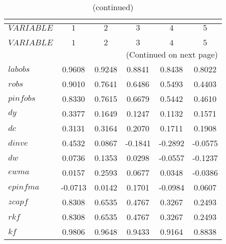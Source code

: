  
\begin{center}
\begin{longtable}{lccccc} 
\caption{AUTOCORRELATION OF SIMULATED VARIABLES}\\
 \label{Table:sim_autocorr_matrix}\\
\toprule 
$VARIABLE  $	 & 	 $          1$	 & 	 $          2$	 & 	 $          3$	 & 	 $          4$	 & 	 $          5$\\
\midrule \endfirsthead 
\caption{(continued)}\\
 \toprule \\ 
$VARIABLE  $	 & 	 $          1$	 & 	 $          2$	 & 	 $          3$	 & 	 $          4$	 & 	 $          5$\\
\midrule \endhead 
\midrule \multicolumn{6}{r}{(Continued on next page)} \\ \bottomrule \endfoot 
\bottomrule \endlastfoot 
$labobs    $	 & 	     0.9608	 & 	     0.9248	 & 	     0.8841	 & 	     0.8438	 & 	     0.8022 \\ 
$robs      $	 & 	     0.9010	 & 	     0.7641	 & 	     0.6486	 & 	     0.5493	 & 	     0.4403 \\ 
$pinfobs   $	 & 	     0.8330	 & 	     0.7615	 & 	     0.6679	 & 	     0.5442	 & 	     0.4610 \\ 
$dy        $	 & 	     0.3377	 & 	     0.1649	 & 	     0.1247	 & 	     0.1132	 & 	     0.1571 \\ 
$dc        $	 & 	     0.3131	 & 	     0.3164	 & 	     0.2070	 & 	     0.1711	 & 	     0.1908 \\ 
$dinve     $	 & 	     0.4532	 & 	     0.0867	 & 	    -0.1841	 & 	    -0.2892	 & 	    -0.0575 \\ 
$dw        $	 & 	     0.0736	 & 	     0.1353	 & 	     0.0298	 & 	    -0.0557	 & 	    -0.1237 \\ 
$ewma      $	 & 	     0.0157	 & 	     0.2593	 & 	     0.0677	 & 	     0.0348	 & 	    -0.0386 \\ 
$epinfma   $	 & 	    -0.0713	 & 	     0.0142	 & 	     0.1701	 & 	    -0.0984	 & 	     0.0607 \\ 
$zcapf     $	 & 	     0.8308	 & 	     0.6535	 & 	     0.4767	 & 	     0.3267	 & 	     0.2493 \\ 
$rkf       $	 & 	     0.8308	 & 	     0.6535	 & 	     0.4767	 & 	     0.3267	 & 	     0.2493 \\ 
$kf        $	 & 	     0.9806	 & 	     0.9648	 & 	     0.9433	 & 	     0.9164	 & 	     0.8838 \\ 

\end{longtable}
\end{center}
